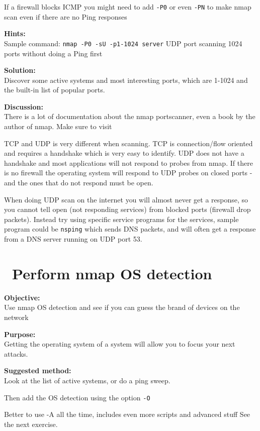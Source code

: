 \documentclass[a4paper,11pt,notitlepage]{report}
\begin{document}
If a firewall blocks ICMP you might need to add \verb+-P0+
or even \verb+-PN+ to make nmap scan even if there are no Ping responses

{\bf Hints:} \\
Sample command: \verb+nmap -P0 -sU -p1-1024 server+ UDP port scanning
1024 ports without doing a Ping first

{\bf Solution:}\\
Discover some active systems and most interesting ports, which are 1-1024 and the built-in list of popular ports.

{\bf Discussion:}\\
There is a lot of documentation about the nmap portscanner, even a book by the author
of nmap. Make sure to visit 

TCP and UDP is very different when scanning. TCP is connection/flow oriented and requires a handshake which is very easy to identify. UDP does not have a handshake and most applications will not respond to probes from nmap. If there is no firewall the operating system will respond to UDP probes on closed ports - and the ones that do not respond must be open.

When doing UDP scan on the internet you will almost never get a response, so you cannot tell open (not responding services) from blocked ports (firewall drop packets). Instead try using specific service programs for the services, sample program could be \verb+nsping+ which sends DNS packets, and will often get a response from a DNS server running on UDP port 53.

\chapter{\faInfoCircle\ Perform nmap OS detection}
\label{ex:nmap-os}

{\bf Objective:} \\
Use nmap OS detection and see if you can guess the brand of devices on the network

{\bf Purpose:}\\
Getting the operating system of a system will allow you to focus your next attacks.

{\bf Suggested method:}\\
Look at the list of active systems, or do a ping sweep.

Then add the OS detection using the option \verb+-O+

Better to use -A all the time, includes even more scripts and advanced stuff
See the next exercise.
\end{document}
